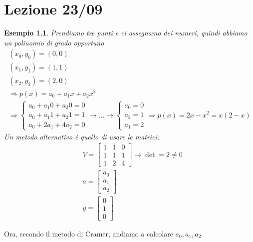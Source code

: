 \documentclass[a4paper, portrait]{book}
\numberwithin{equation}{chapter} %
\newtheorem{example}{Esempio}
\begin{document}
\chapter{Lezione 23/09}
\begin{example}
    Prendiamo tre punti e ci assegnamo dei numeri, quindi abbiamo un polinomio di grado opportuno
    \begin{gather}
        (x_0,y_0) = (0,0)\\
        (x_1,y_1) = (1,1)\\
        (x_2,y_2) = (2,0)\\
        \Rightarrow p(x) = a_0 + a_1 x + a_2 x^2\\
        \Rightarrow \begin{cases}
            a_0 + a_1 0 + a_2 0 = 0\\
            a_0 + a_1 1 + a_2 1 = 1\\
            a_0 + 2a_1 + 4 a_2 = 0
        \end{cases} \rightarrow ... \rightarrow \begin{cases}
            a_0 = 0\\
            a_2 = 1\\
            a_1 = 2
        \end{cases} \Rightarrow p(x) = 2x - x^2 = x(2-x)
    \end{gather}
    Un metodo alternativo è quello di usare le matrici:
    \begin{align}
        &V = \begin{bmatrix}
            1&1&0\\
            1&1&1\\
            1&2&4
        \end{bmatrix} \rightarrow \det = 2 \neq 0\\
        &a = \begin{bmatrix}
            a_0\\a_1\\a_2
        \end{bmatrix}\\
        &y = \begin{bmatrix}
            0\\1\\0
        \end{bmatrix}
    \end{align}
\end{example}
Ora, secondo il metodo di Cramer, andiamo a calcolare $a_0, a_1,a_2$
\end{document}

